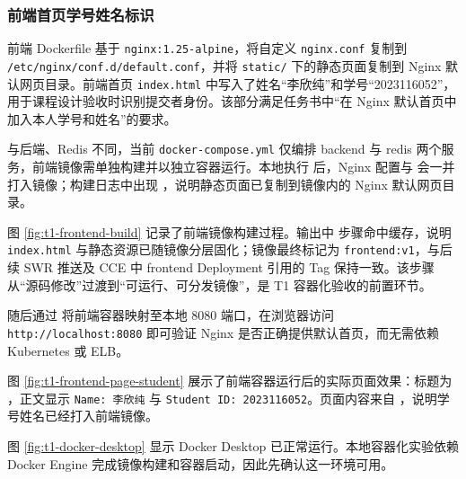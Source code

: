 \subsubsection{前端首页学号姓名标识}

前端 Dockerfile 基于 \verb|nginx:1.25-alpine|，将自定义 \verb|nginx.conf| 复制到 \verb|/etc/nginx/conf.d/default.conf|，并将 \verb|static/| 下的静态页面复制到 Nginx 默认网页目录。前端首页 \verb|index.html| 中写入了姓名“李欣纯”和学号“2023116052”，用于课程设计验收时识别提交者身份。该部分满足任务书中“在 Nginx 默认首页中加入本人学号和姓名”的要求。

与后端、Redis 不同，当前 \verb|docker-compose.yml| 仅编排 backend 与 redis 两个服务，前端镜像需单独构建并以独立容器运行。本地执行 \texttt{} 后，Nginx 配置与 \texttt{} 会一并打入镜像；构建日志中出现 \texttt{}，说明静态页面已复制到镜像内的 Nginx 默认网页目录。


图 \ref{fig:t1-frontend-build} 记录了前端镜像构建过程。输出中 \texttt{} 步骤命中缓存，说明 \verb|index.html| 与静态资源已随镜像分层固化；镜像最终标记为 \verb|frontend:v1|，与后续 SWR 推送及 CCE 中 frontend Deployment 引用的 Tag 保持一致。该步骤从“源码修改”过渡到“可运行、可分发镜像”，是 T1 容器化验收的前置环节。

随后通过 \texttt{} 将前端容器映射至本地 8080 端口，在浏览器访问 \verb|http://localhost:8080| 即可验证 Nginx 是否正确提供默认首页，而无需依赖 Kubernetes 或 ELB。


图 \ref{fig:t1-frontend-page-student} 展示了前端容器运行后的实际页面效果：标题为 \texttt{}，正文显示 \verb|Name: 李欣纯| 与 \verb|Student ID: 2023116052|。页面内容来自 \texttt{}，说明学号姓名已经打入前端镜像。


图 \ref{fig:t1-docker-desktop} 显示 Docker Desktop 已正常运行。本地容器化实验依赖 Docker Engine 完成镜像构建和容器启动，因此先确认这一环境可用。

